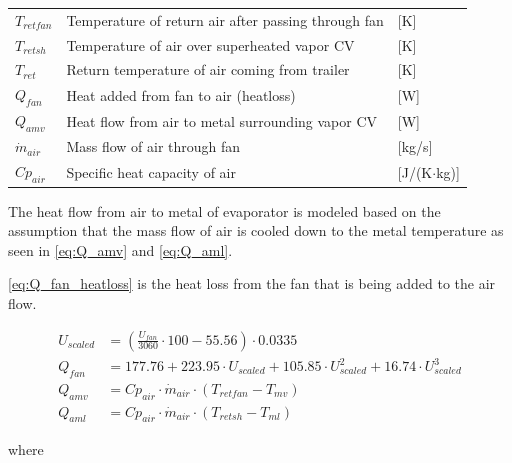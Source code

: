 \begin{center}
	\begin{tabular}{l p{10cm} l}
		$T_{retfan}$    & Temperature of return air after passing through fan & [\si{K}]                          \\
		$T_{retsh}$     & Temperature of air over superheated vapor CV        & [\si{K}]                          \\
		$T_{ret}$       & Return temperature of air coming from trailer       & [\si{K}]                          \\
		$Q_{fan}$       & Heat added from fan to air (heatloss)               & [\si{W}]                          \\
		$Q_{amv}$       & Heat flow from air to metal surrounding vapor CV    & [\si{W}]                          \\
		$\dot{m}_{air}$ & Mass flow of air through fan                        & [\si{kg}/\si{s}]                  \\
		$Cp_{air}$      & Specific heat capacity of air                       & [\si{J}/(\si{K}$ \cdot $\si{kg})]
	\end{tabular}
\end{center}

\medskip
The heat flow from air to metal of evaporator is modeled based on the assumption that the mass flow of air is cooled down to the metal temperature as seen in \cref{eq:Q_amv} and \cref{eq:Q_aml}.

\cref{eq:Q_fan_heatloss} is the heat loss from the fan that is being added to the air flow.

\begin{align}
	U_{scaled} & = \left( \frac{U_{fan}}{3060}\cdot 100 - 55.56 \right) \cdot 0.0335 \\
	Q_{fan} & = 177.76 + 223.95 \cdot U_{scaled} + 105.85 \cdot U_{scaled}^2 + 16.74 \cdot U_{scaled}^3
	\label{eq:Q_fan_heatloss}  \\
	Q_{amv} 		& = Cp_{air} \cdot \dot{m}_{air} \cdot (T_{retfan} - T_{mv}) 	\label{eq:Q_amv} \\
	Q_{aml} 		& = Cp_{air} \cdot \dot{m}_{air} \cdot (T_{retsh} - T_{ml}) 	\label{eq:Q_aml}
\end{align}

where

